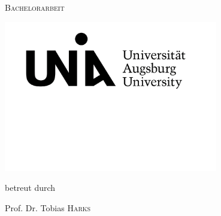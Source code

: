 
\thispagestyle{empty}
\begin{titlepage}
	\makeatletter
	\centering
	{\scshape\LARGE Bachelorarbeit \par}
	\vspace{1cm}

	\vspace{1.5cm}
	{\huge\bfseries \@title\par}
	\vspace{2cm}
	{\Large\textsc{\@author}\par}
	\vfill
	\includegraphics[width=0.7\textwidth]{bachelorarbeit/logo}\par\vspace{1cm}
	betreut durch\par
	Prof. Dr. Tobias \textsc{Harks}
	
	\vfill
	
	{\large \@date\par}
	\makeatother
\end{titlepage}